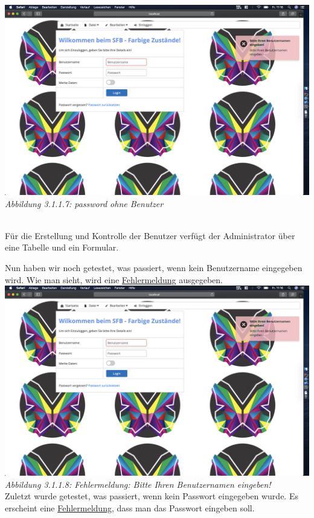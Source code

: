 \documentclass[enabledeprecatedfontcommands,fontsize=12pt,paper=a4,twoside]{scrartcl}
\begin{document}
\hypertarget{sc3.1.1.7}{
\includegraphics[width=1\textwidth]{Screenshots/311PasswordohneBenutzer.png}
\textit{Abbildung 3.1.1.7: password ohne Benutzer}
} \\


Für die Erstellung und Kontrolle der Benutzer verfügt der Administrator über eine Tabelle und ein Formular.

Nun haben wir noch getestet, was passiert, wenn kein Benutzername eingegeben wird. Wie man sieht, wird eine  \hyperlink{sc3.1.1.8}{Fehlermeldung} ausgegeben. \\

\hypertarget{sc3.1.1.8}{
\includegraphics[width=1\textwidth]{Screenshots/311PasswordohneBenutzer.png}
\textit{Abbildung 3.1.1.8: Fehlermeldung: Bitte Ihren Benutzernamen eingeben!}
} \\

Zuletzt wurde getestet, was passiert, wenn kein Passwort eingegeben wurde. Es erscheint eine \hyperlink{sc3.1.1.9}{Fehlermeldung}, dass man das Passwort eingeben soll. 
\end{document}
